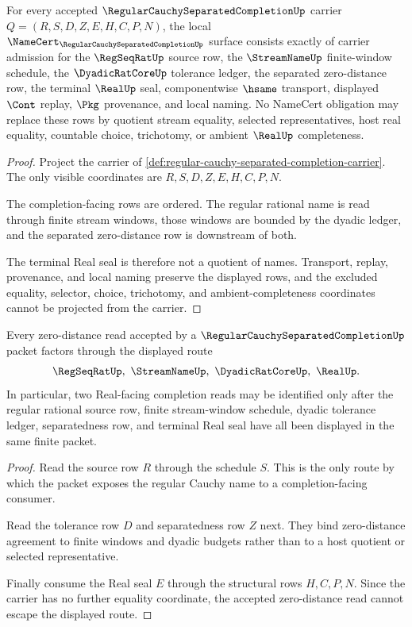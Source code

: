 \begin{theorem}
\label{thm:regular-cauchy-separated-completion-namecert-obligations}
For every accepted $\RegularCauchySeparatedCompletionUp$ carrier $Q=(R,S,D,Z,E,H,C,P,N)$, the local $\NameCert_{\RegularCauchySeparatedCompletionUp}$ surface consists exactly of carrier admission for the $\RegSeqRatUp$ source row, the $\StreamNameUp$ finite-window schedule, the $\DyadicRatCoreUp$ tolerance ledger, the separated zero-distance row, the terminal $\RealUp$ seal, componentwise $\hsame$ transport, displayed $\Cont$ replay, $\Pkg$ provenance, and local naming. No NameCert obligation may replace these rows by quotient stream equality, selected representatives, host real equality, countable choice, trichotomy, or ambient $\RealUp$ completeness.
\end{theorem}
\begin{proof}
Project the carrier of \autoref{def:regular-cauchy-separated-completion-carrier}. The only visible coordinates are $R,S,D,Z,E,H,C,P,N$.

The completion-facing rows are ordered. The regular rational name is read through finite stream windows, those windows are bounded by the dyadic ledger, and the separated zero-distance row is downstream of both.

The terminal Real seal is therefore not a quotient of names. Transport, replay, provenance, and local naming preserve the displayed rows, and the excluded equality, selector, choice, trichotomy, and ambient-completeness coordinates cannot be projected from the carrier.
\end{proof}

\begin{theorem}
\label{thm:regular-cauchy-separated-completion-zero-distance}
Every zero-distance read accepted by a $\RegularCauchySeparatedCompletionUp$ packet factors through the displayed route
$$
\RegSeqRatUp,\ \StreamNameUp,\ \DyadicRatCoreUp,\ \RealUp .
$$
In particular, two Real-facing completion reads may be identified only after the regular rational source row, finite stream-window schedule, dyadic tolerance ledger, separatedness row, and terminal Real seal have all been displayed in the same finite packet.
\end{theorem}
\begin{proof}
Read the source row $R$ through the schedule $S$. This is the only route by which the packet exposes the regular Cauchy name to a completion-facing consumer.

Read the tolerance row $D$ and separatedness row $Z$ next. They bind zero-distance agreement to finite windows and dyadic budgets rather than to a host quotient or selected representative.

Finally consume the Real seal $E$ through the structural rows $H,C,P,N$. Since the carrier has no further equality coordinate, the accepted zero-distance read cannot escape the displayed route.
\end{proof}


